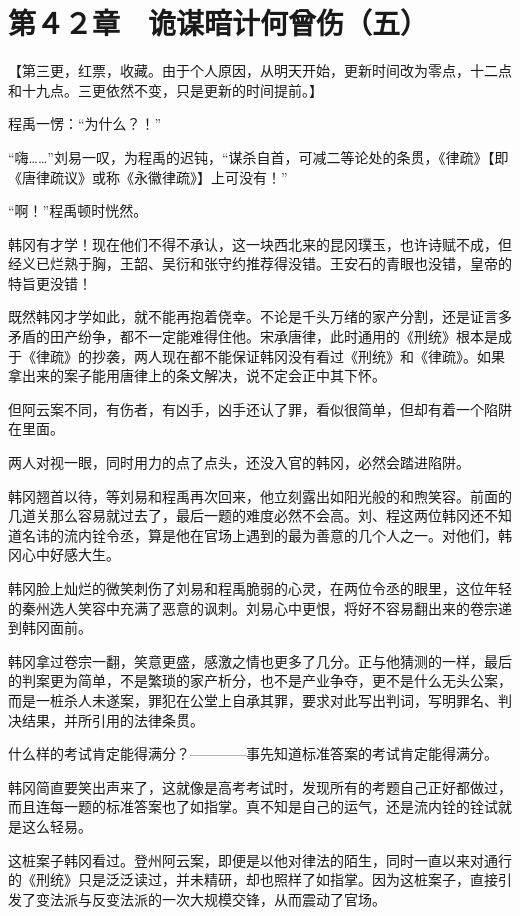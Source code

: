\section{第４２章　诡谋暗计何曾伤（五）}

【第三更，红票，收藏。由于个人原因，从明天开始，更新时间改为零点，十二点和十九点。三更依然不变，只是更新的时间提前。】

程禹一愣：“为什么？！”

“嗨……”刘易一叹，为程禹的迟钝，“谋杀自首，可减二等论处的条贯，《律疏》【即《唐律疏议》或称《永徽律疏》】上可没有！”

“啊！”程禹顿时恍然。

韩冈有才学！现在他们不得不承认，这一块西北来的昆冈璞玉，也许诗赋不成，但经义已烂熟于胸，王韶、吴衍和张守约推荐得没错。王安石的青眼也没错，皇帝的特旨更没错！

既然韩冈才学如此，就不能再抱着侥幸。不论是千头万绪的家产分割，还是证言多矛盾的田产纷争，都不一定能难得住他。宋承唐律，此时通用的《刑统》根本是成于《律疏》的抄袭，两人现在都不能保证韩冈没有看过《刑统》和《律疏》。如果拿出来的案子能用唐律上的条文解决，说不定会正中其下怀。

但阿云案不同，有伤者，有凶手，凶手还认了罪，看似很简单，但却有着一个陷阱在里面。

两人对视一眼，同时用力的点了点头，还没入官的韩冈，必然会踏进陷阱。

韩冈翘首以待，等刘易和程禹再次回来，他立刻露出如阳光般的和煦笑容。前面的几道关那么容易就过去了，最后一题的难度必然不会高。刘、程这两位韩冈还不知道名讳的流内铨令丞，算是他在官场上遇到的最为善意的几个人之一。对他们，韩冈心中好感大生。

韩冈脸上灿烂的微笑刺伤了刘易和程禹脆弱的心灵，在两位令丞的眼里，这位年轻的秦州选人笑容中充满了恶意的讽刺。刘易心中更恨，将好不容易翻出来的卷宗递到韩冈面前。

韩冈拿过卷宗一翻，笑意更盛，感激之情也更多了几分。正与他猜测的一样，最后的判案更为简单，不是繁琐的家产析分，也不是产业争夺，更不是什么无头公案，而是一桩杀人未遂案，罪犯在公堂上自承其罪，要求对此写出判词，写明罪名、判决结果，并所引用的法律条贯。

什么样的考试肯定能得满分？————事先知道标准答案的考试肯定能得满分。

韩冈简直要笑出声来了，这就像是高考考试时，发现所有的考题自己正好都做过，而且连每一题的标准答案也了如指掌。真不知是自己的运气，还是流内铨的铨试就是这么轻易。

这桩案子韩冈看过。登州阿云案，即便是以他对律法的陌生，同时一直以来对通行的《刑统》只是泛泛读过，并未精研，却也照样了如指掌。因为这桩案子，直接引发了变法派与反变法派的一次大规模交锋，从而震动了官场。

